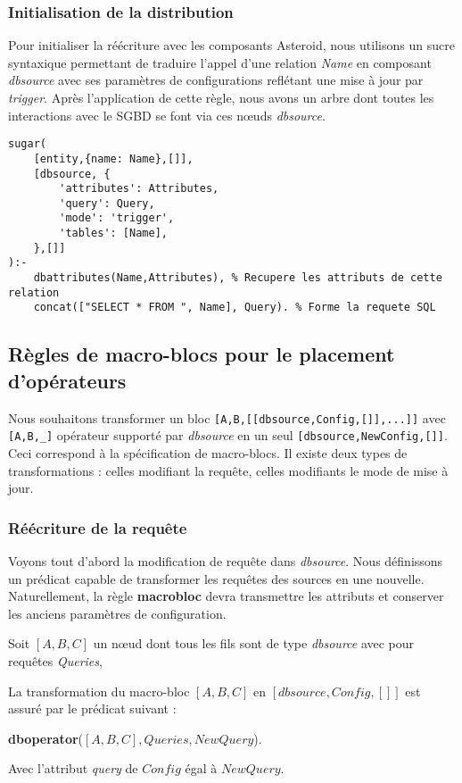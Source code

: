 \subsubsection{Initialisation de la distribution}
Pour initialiser la réécriture avec les composants Asteroid, nous utilisons un sucre syntaxique permettant de traduire l'appel d'une relation \textit{Name} en composant \textit{dbsource} avec ses paramètres de configurations reflétant une mise à jour par \textit{trigger}. Après l'application de cette règle, nous avons un arbre dont toutes les interactions avec le SGBD se font via ces nœuds \textit{dbsource}.
\begin{lstlisting}
sugar(
    [entity,{name: Name},[]],
    [dbsource, {
        'attributes': Attributes,
        'query': Query,
        'mode': 'trigger', 
        'tables': [Name],
    },[]]
):-
    dbattributes(Name,Attributes), % Recupere les attributs de cette relation
    concat(["SELECT * FROM ", Name], Query). % Forme la requete SQL
\end{lstlisting}

\subsection{Règles de macro-blocs pour le placement d'opérateurs}
Nous souhaitons transformer un bloc \lstinline|[A,B,[[dbsource,Config,[]],...]]| avec \lstinline|[A,B,_]| opérateur supporté par \textit{dbsource} en un seul \lstinline|[dbsource,NewConfig,[]]|. Ceci correspond à la spécification de macro-blocs. Il existe deux types de transformations : celles modifiant la requête, celles modifiants le mode de mise à jour.

\subsubsection{Réécriture de la requête}
Voyons tout d'abord la modification de requête dans \textit{dbsource}. Nous définissons un prédicat capable de transformer les requêtes des sources en une nouvelle. Naturellement, la règle \textbf{macrobloc} devra transmettre les attributs et conserver les anciens paramètres de configuration.
\begin{regle}
    Soit $[A,B,C]$ un nœud dont tous les fils sont de type \textit{dbsource} avec pour requêtes \textit{Queries},

    La transformation du macro-bloc $[A,B,C]$ en $[dbsource,Config,[]]$ est assuré par le prédicat suivant :
    \begin{center} \textbf{dboperator}($[A,B,C], Queries, NewQuery$). \end{center}
    Avec l'attribut \textit{query} de $Config$ égal à $NewQuery$.
\end{regle}

